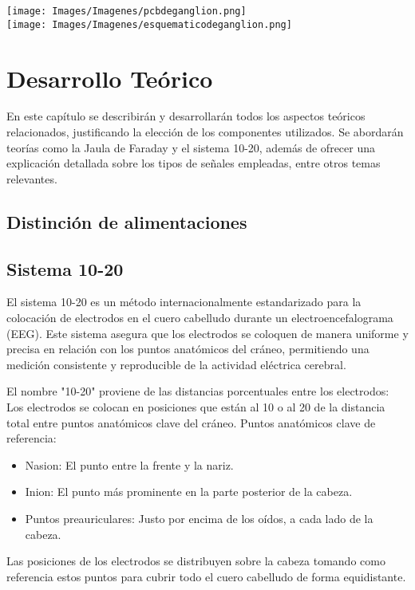 \documentclass{article}
\begin{document}
\begin{center}
    \texttt{[image: Images/Imagenes/pcbdeganglion.png]}\\

    \texttt{[image: Images/Imagenes/esquematicodeganglion.png]}\\
\end {center}

\section{Desarrollo Teórico}
En este capítulo se describirán y desarrollarán todos los aspectos teóricos relacionados, justificando la elección de los componentes utilizados. Se abordarán teorías como la Jaula de Faraday y el sistema 10-20, además de ofrecer una explicación detallada sobre los tipos de señales empleadas, entre otros temas relevantes.

\subsection{Distinción de alimentaciones}

\subsection{Sistema 10-20}

El sistema 10-20 es un método internacionalmente estandarizado para la colocación de electrodos en el cuero cabelludo durante un electroencefalograma (EEG). Este sistema asegura que los electrodos se coloquen de manera uniforme y precisa en relación con los puntos anatómicos del cráneo, permitiendo una medición consistente y reproducible de la actividad eléctrica cerebral.

El nombre "10-20" proviene de las distancias porcentuales entre los electrodos: Los electrodos se colocan en posiciones que están al 10 o al 20 de la distancia total entre puntos anatómicos clave del cráneo.
Puntos anatómicos clave de referencia:
\begin{itemize}
    \item Nasion: El punto entre la frente y la nariz.
    \item Inion: El punto más prominente en la parte posterior de la cabeza.
    \item Puntos preauriculares: Justo por encima de los oídos, a cada lado de la cabeza.
\end{itemize}
Las posiciones de los electrodos se distribuyen sobre la cabeza tomando como referencia estos puntos para cubrir todo el cuero cabelludo de forma equidistante.
\end{document}
